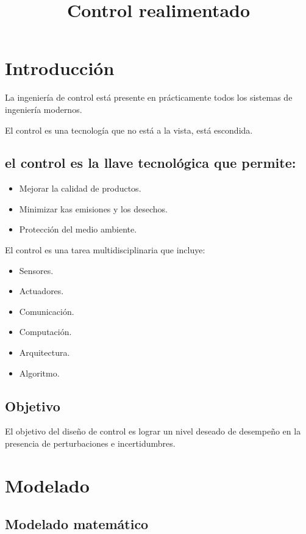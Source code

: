 \documentclass[a4paper]{article}
\begin{document}
\title{Control realimentado}
\maketitle
\date{}
\section{Introducción}\label{sec:intro}

La ingeniería de control está presente en prácticamente todos los sistemas de ingeniería modernos.

El control es una tecnología que no está a la vista, está escondida.

\subsection{el control es la llave tecnológica que permite:}
\begin{itemize}
\item Mejorar la calidad de productos.
\item Minimizar kas emisiones y los desechos.
\item Protección del medio ambiente.
\end{itemize}

El control es una tarea multidisciplinaria que incluye:
\begin{itemize}
\item Sensores.
\item Actuadores.
\item Comunicación.
\item Computación.
\item Arquitectura.
\item Algoritmo.
\end{itemize}

\subsection{Objetivo}

El objetivo del diseño de control es lograr un nivel deseado de desempeño en la presencia de perturbaciones e incertidumbres.

\section{Modelado}\label{sec:modelado}
\subsection{Modelado matemático}
\end{document}
